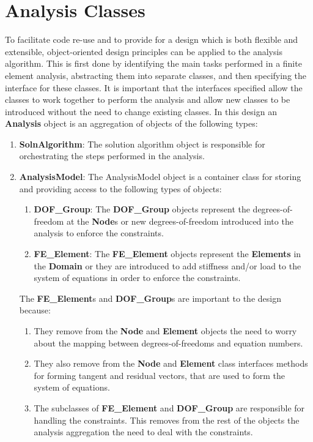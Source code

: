 \section{Analysis Classes}
To facilitate code re-use and to provide for a design which is both
flexible and extensible, object-oriented design principles can be
applied to the analysis algorithm. This is first done by identifying
the main tasks performed in a finite element analysis, abstracting
them into separate classes, and then specifying the interface for
these classes. It is important that the interfaces specified allow the
classes to work together to perform the analysis and allow new classes
to be introduced without the need to change existing classes. 
In this design an {\bf Analysis} object is an aggregation of objects
of the following types: 
\begin{enumerate}   

\item {\bf SolnAlgorithm}: The solution algorithm object is responsible for 
orchestrating the steps performed in the analysis.

\item {\bf AnalysisModel}: The AnalysisModel object is a container class for
storing and providing access to the following types of objects:
\begin{enumerate}
\item {\bf DOF\_Group}: The {\bf DOF\_Group} objects represent the
degrees-of-freedom at the {\bf Node}s or new degrees-of-freedom
introduced into the analysis to enforce the constraints.
\item {\bf FE\_Element}: The {\bf FE\_Element} objects represent the
{\bf Elements} in the {\bf Domain} or they are introduced to add stiffness
and/or load to the system of equations in order to enforce the
constraints. 
\end{enumerate}
The {\bf FE\_Element}s and {\bf DOF\_Group}s are important to the
design because: \begin{enumerate}
\item They remove from the {\bf Node} and {\bf Element} objects the
need to worry about the mapping between degrees-of-freedoms and
equation numbers. 
\item They also remove from the {\bf Node} and {\bf Element} class
interfaces methods for forming tangent and residual vectors, that are
used to form the system of equations. 
\item The subclasses of {\bf FE\_Element} and {\bf DOF\_Group} are
responsible for 
handling the constraints. This removes from the rest of the objects
the analysis aggregation the need to deal with the constraints. 
\end{enumerate}


\end{enumerate}
